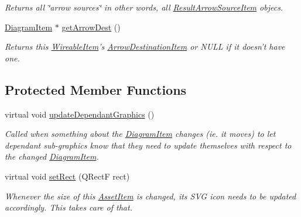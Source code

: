 \begin{DoxyCompactItemize}
\begin{DoxyCompactList}\small\item\em Returns all \char`\"{}arrow sources\char`\"{} in other words, all \hyperlink{class_result_arrow_source_item}{Result\-Arrow\-Source\-Item} objecs. \end{DoxyCompactList}\item 
\hypertarget{class_wireable_item_a5f8262432eb4666fe5dd85f796ae711d}{\hyperlink{class_diagram_item}{Diagram\-Item} $\ast$ \hyperlink{class_wireable_item_a5f8262432eb4666fe5dd85f796ae711d}{get\-Arrow\-Dest} ()}\label{class_wireable_item_a5f8262432eb4666fe5dd85f796ae711d}

\begin{DoxyCompactList}\small\item\em Returns this \hyperlink{class_wireable_item}{Wireable\-Item}'s \hyperlink{class_arrow_destination_item}{Arrow\-Destination\-Item} or N\-U\-L\-L if it doesn't have one. \end{DoxyCompactList}\end{DoxyCompactItemize}
\subsection*{Protected Member Functions}
\begin{DoxyCompactItemize}
\item 
\hypertarget{class_wireable_item_a59cca01c20c194d1f0a322e6597af73d}{virtual void \hyperlink{class_wireable_item_a59cca01c20c194d1f0a322e6597af73d}{update\-Dependant\-Graphics} ()}\label{class_wireable_item_a59cca01c20c194d1f0a322e6597af73d}

\begin{DoxyCompactList}\small\item\em Called when something about the \hyperlink{class_diagram_item}{Diagram\-Item} changes (ie. it moves) to let dependant sub-\/graphics know that they need to update themselves with respect to the changed \hyperlink{class_diagram_item}{Diagram\-Item}. \end{DoxyCompactList}\item 
\hypertarget{class_wireable_item_a12ed56fb0b7d6c086c4c1599dd4020b1}{virtual void \hyperlink{class_wireable_item_a12ed56fb0b7d6c086c4c1599dd4020b1}{set\-Rect} (Q\-Rect\-F rect)}\label{class_wireable_item_a12ed56fb0b7d6c086c4c1599dd4020b1}

\begin{DoxyCompactList}\small\item\em Whenever the size of this \hyperlink{class_asset_item}{Asset\-Item} is changed, its S\-V\-G icon needs to be updated accordingly. This takes care of that. \end{DoxyCompactList}\end{DoxyCompactItemize}
